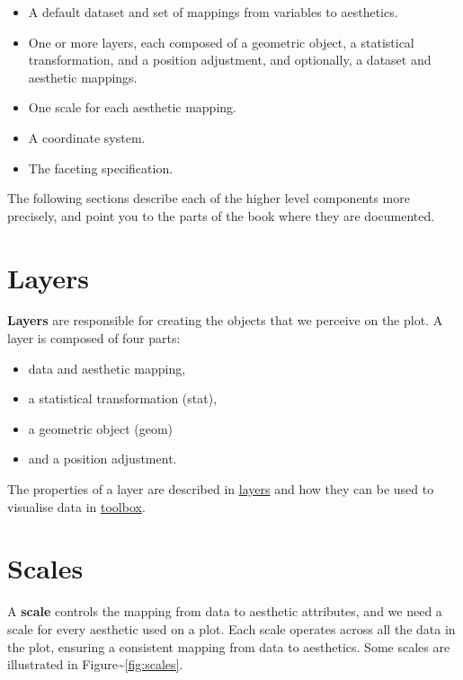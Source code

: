 \begin{itemize}
\itemsep1pt\parskip0pt
\item
  A default dataset and set of mappings from variables to aesthetics.
\item
  One or more layers, each composed of a geometric object, a statistical
  transformation, and a position adjustment, and optionally, a dataset
  and aesthetic mappings.
\item
  One scale for each aesthetic mapping.
\item
  A coordinate system.
\item
  The faceting specification.
\end{itemize}

The following sections describe each of the higher level components more
precisely, and point you to the parts of the book where they are
documented.

\section{Layers}

\textbf{Layers} are responsible for creating the objects that we
perceive on the plot. A layer is composed of four parts:

\begin{itemize}
\itemsep1pt\parskip0pt
\item
  data and aesthetic mapping,
\item
  a statistical transformation (stat),
\item
  a geometric object (geom)
\item
  and a position adjustment.
\end{itemize}

\noindent The properties of a layer are described in
\hyperref[cha:layers]{layers} and how they can be used to visualise data
in \hyperref[cha:toolbox]{toolbox}.

\section{Scales}\label{sec:scales}

A \textbf{scale} controls the mapping from data to aesthetic attributes,
and we need a scale for every aesthetic used on a plot. Each scale
operates across all the data in the plot, ensuring a consistent mapping
from data to aesthetics. Some scales are illustrated in
Figure\textasciitilde{}\ref{fig:scales}.

